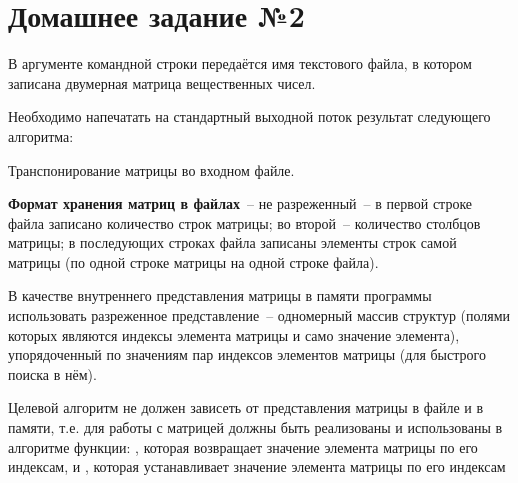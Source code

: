 \section*{Домашнее задание №2}

В аргументе командной строки передаётся имя текстового файла,
в котором записана двумерная матрица
вещественных чисел.

Необходимо напечатать на стандартный выходной
поток результат следующего алгоритма:

Транспонирование матрицы во входном файле.

\textbf{Формат хранения матриц в файлах}~--
не разреженный~-- в первой строке файла записано количество строк
матрицы; во второй~-- количество столбцов матрицы; в последующих
строках файла записаны элементы строк самой матрицы (по одной
строке матрицы на одной строке файла).

В качестве внутреннего представления матрицы в памяти программы
использовать разреженное представление~-- одномерный массив структур (полями
которых являются индексы элемента матрицы и само значение
элемента), упорядоченный по значениям пар индексов элементов
матрицы (для быстрого поиска в нём).

Целевой алгоритм не
должен зависеть от представления матрицы в файле и в памяти, т.е. для
работы с матрицей должны быть реализованы и использованы в алгоритме
функции: , которая возвращает
значение элемента матрицы по его индексам, и , которая устанавливает значение элемента
матрицы по его индексам
